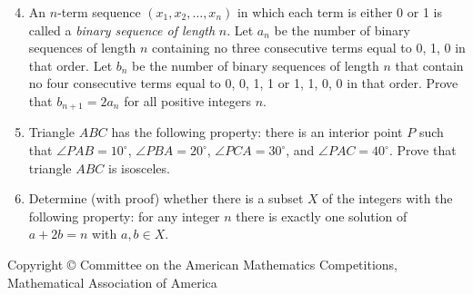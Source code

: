 \documentclass[12pt]{article}
\begin{document}
\begin{enumerate}
\setcounter{enumi}{3}

\item %
An $n$-term sequence $(x_1, x_2, \ldots, x_n)$ in which each
term is either 0 or 1 is called a {\em binary sequence of length}
$n$.  Let $a_n$ be the number of binary sequences of length $n$
containing no three consecutive terms equal to 0, 1, 0 in that
order.  Let $b_n$ be the number of binary sequences
of length $n$ that contain no four consecutive terms equal to 
0, 0, 1, 1 or 1, 1, 0, 0 in that order. Prove that 
$b_{n+1} = 2a_n$ for all positive integers $n$.

\item %
Triangle $ABC$ has the following property: there is an
interior point $P$ such that $\angle PAB = 10^{\circ}$,
$\angle PBA = 20^{\circ}$, $\angle PCA = 30^{\circ}$, 
and $\angle PAC = 40^{\circ}$.  Prove that triangle
$ABC$ is isosceles.

\item %
Determine (with proof) whether there is a subset $X$ of the
integers with the following property: for any integer $n$
there is exactly one solution of $a + 2b = n$ with
$a,b \in X$.

\end{enumerate}
\vspace*{\fill}
\begin{center}
{\footnotesize Copyright \copyright \hspace{.05in} Committee on
the American Mathematics Competitions, \\ 
Mathematical Association of America}
\end{center}
\end{document}
